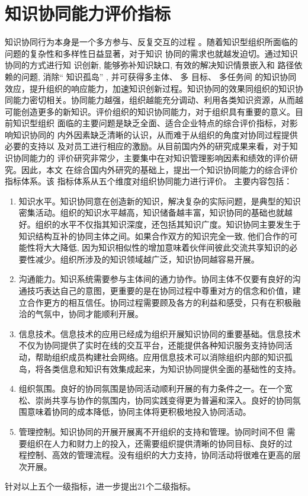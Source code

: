 \documentclass[adobefonts,UTF8]{ctexart}
\begin{document}
\section{知识协同能力评价指标}
知识协同行为本身是一个多方参与、反复交互的过程
。随着知识型组织所面临的问题的复杂性和多样性日益显著，对于知识
协同的需求也就越发迫切。通过知识协同的方式进行知
识创新, 能够弥补知识缺口, 有效的解决知识情景嵌入和
路径依赖的问题, 消除“ 知识孤岛” , 并可获得多主体、 多
目标、 多任务间 的知识协同效应，提升组织的响应能力，加速知识创新过程。知识协同的效果同组织的知识协同能力密切相关。协同能力越强，组织越能充分调动、利用各类知识资源，从而越可能创造更多的新知识。评价组织的知识协同能力，对于组织具有重要的意义。目前知识型组织
面临的主要问题是缺乏全面、适合企业特点的综合评价指标，对影响知识协同的
内外因素缺乏清晰的认识，从而难于从组织的角度对协同过程提供必要的支持以
及对员工进行相应的激励。从目前国内外的研究成果来看，对于知识协同能力的
评价研究非常少，主要集中在对知识管理影响因素和绩效的评价研究。因此，本文
在综合国内外研究的基础上，提出一个知识协同能力的综合评价指标体系。该
指标体系从五个维度对组织协同能力进行评价。
主要内容包括：
\begin{enumerate}
\item 知识水平。知识协同意在创造新的知识，解决复杂的实际问题，是典型的知识密集活动。组织的知识水平越高，知识储备越丰富，知识协同的基础也就越好。组织的水平不仅指其知识深度，还包括其知识广度。知识协同主要发生于知识结构互补的协同主体之间。如果合作双方的知识完全一致, 他们合作的可能性将大大降低, 因为知识相似性的增加意味着伙伴间彼此交流共享知识的必要性减少\cite{cowan2006evolving}。组织所涉及的知识领域越广泛，知识协同越容易开展。
\item 沟通能力。知识系统需要参与主体间的通力协作。协同主体不仅要有良好的沟通技巧表达自己的意图，更重要的是在协同过程中尊重对方的信念和价值，建立合作更方的相互信任。协同过程需要顾及各方的利益和感受，只有在积极融洽的气氛中，协同才能顺利开展。
\item 信息技术。信息技术的应用已经成为组织开展知识协同的重要基础。信息技术不仅为协同提供了实时在线的交互平台，还能提供各种知识服务支持协同活动，帮助组织成员构建社会网络。应用信息技术可以消除组织内部的知识孤岛，将各类信息和知识有效集成起来，为知识协同提供全面的基础性的支持。
\item 组织氛围。良好的协同氛围是协同活动顺利开展的有力条件之一。在一个宽松、崇尚共享与协作的氛围内，协同实践变得更为普遍和深入。良好的协同氛围意味着协同的成本降低，协同主体将更积极地投入协同活动。
\item 管理控制。知识协同的开展开展离不开组织的支持和管理。协同时间不但
  需要组织在人力和财力上的投入，还需要组织提供清晰的协同目标、良好的过
  程控制、高效的管理流程。没有组织的大力支持，协同活动将很难在更高的层次开展。
\end{enumerate}
针对以上五个一级指标，进一步提出21个二级指标。
\end{document}
